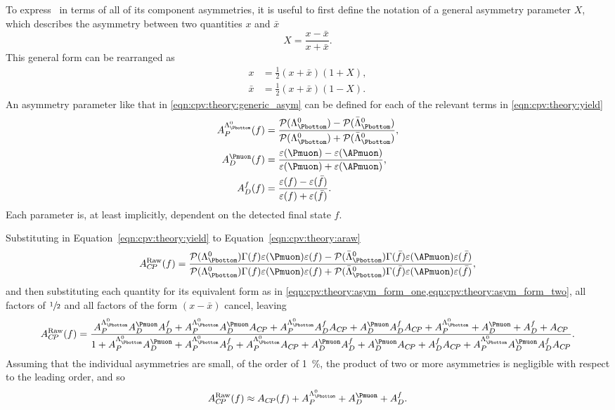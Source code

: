 To express \ARaw\ in terms of all of its component asymmetries, it is useful to 
first define the notation of a general asymmetry parameter $X$, which describes 
the asymmetry between two quantities $x$ and $\bar{x}$
\begin{equation}
  X = \frac{x - \bar{x}}{x + \bar{x}}.
  \label{eqn:cpv:theory:generic_asym}
\end{equation}
This general form can be rearranged as
\begin{align}
  x &= \frac{1}{2}(x + \bar{x})(1 + X),\label{eqn:cpv:theory:asym_form_one}\\
  \bar{x} &= \frac{1}{2}(x + \bar{x})(1 - X).\label{eqn:cpv:theory:asym_form_two}
\end{align}
An asymmetry parameter like that in \cref{eqn:cpv:theory:generic_asym} can be defined for each of the relevant terms in 
\cref{eqn:cpv:theory:yield}
\begin{align*}
  \APLb(f) &= \frac{%
    \prob(\PLambdab) - \prob(\APLambdab)
  }{%
    \prob(\PLambdab) + \prob(\APLambdab)
  },\\
  \ADmu(f) &= \frac{%
    \eff(\Pmuon) - \eff(\APmuon)
  }{%
    \eff(\Pmuon) + \eff(\APmuon)
  },\\
  \ADf(f)  &= \frac{%
    \eff(f) - \eff(\bar{f})
  }{%
    \eff(f) + \eff(\bar{f})
  }.
\end{align*}
Each parameter is, at least implicitly, dependent on the detected final state 
$f$.

Substituting in Equation~\ref{eqn:cpv:theory:yield} to 
Equation~\ref{eqn:cpv:theory:araw}
\begin{equation*}
  \ARaw(f) = \frac{%
    \prob(\PLambdab)\Gamma(f)\eff(\Pmuon)\eff(f) - 
    \prob(\APLambdab)\Gamma(\bar{f})\eff(\APmuon)\eff(\bar{f})
  }{%
    \prob(\PLambdab)\Gamma(f)\eff(\Pmuon)\eff(f) + 
    \prob(\APLambdab)\Gamma(\bar{f})\eff(\APmuon)\eff(\bar{f})
  },
\end{equation*}
and then substituting each quantity for its equivalent form as in 
\cref{eqn:cpv:theory:asym_form_one,eqn:cpv:theory:asym_form_two}, all factors 
of $\sfrac{1}{2}$ and all factors of the form $(x - \bar{x})$ cancel, leaving
\begin{equation*}
  \ARaw(f) = \frac{%
    \APLb\ADmu\ADf + \APLb\ADmu\ACP + \APLb\ADf\ACP + \ADmu\ADf\ACP + \APLb + 
    \ADmu + \ADf + \ACP
  }{%
    1 + \APLb\ADmu + \APLb\ADf + \APLb\ACP + \ADmu\ADf + \ADmu\ACP + \ADf\ACP + 
    \APLb\ADmu\ADf\ACP
  }.
\end{equation*}
Assuming that the individual asymmetries are small, of the order of 
\SI{1}{\percent}, the product of two or more asymmetries is negligible with 
respect to the leading order, and so
\begin{equation}
  \ARaw(f) \approx \ACP(f) + \APLb + \ADmu + \ADf.
\end{equation}

